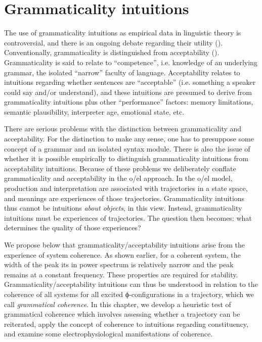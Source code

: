\chapter{Grammaticality intuitions}

The use of grammaticality intuitions as empirical data in linguistic theory is controversial, and there is an ongoing debate regarding their utility (\citealt{CulicoverJackendoff2010,FFerreira2005,GibsonFedorenko2010,GibsonFedorenko2013,SprouseAlmeida2013}). Conventionally, grammaticality is distinguished from acceptability (\citealt{Schütze2016,Sprouse2007}). Grammaticality is said to relate to “competence”, i.e. knowledge of an underlying grammar, the isolated “narrow” faculty of language. Acceptability relates to intuitions regarding whether sentences are “acceptable” (i.e. something a speaker could say and/or understand), and these intuitions are presumed to derive from grammaticality intuitions plus other “performance” factors: memory limitations, semantic plausibility, interpreter age, emotional state, etc. 

  There are serious problems with the distinction between grammaticality and acceptability. For the distinction to make any sense, one has to presuppose some concept of a grammar and an isolated syntax module. There is also the issue of whether it is possible empirically to distinguish grammaticality intuitions from acceptability intuitions. Because of these problems we deliberately conflate grammaticality and acceptability in the o/el approach. In the o/el model, production and interpretation are associated with trajectories in a state space, and meanings are experiences of those trajectories. Grammaticality intuitions thus cannot be intuitions \textit{about objects}, in this view. Instead, grammaticality intuitions must be experiences of trajectories. The question then becomes: what determines the quality of those experiences? 

  We propose below that grammaticality/acceptability intuitions arise from the experience of system coherence. As shown earlier, for a coherent system, the width of the peak its in power spectrum is relatively narrow and the peak remains at a constant frequency. These properties are required for stability. Grammaticality/acceptability intuitions can thus be understood in relation to the coherence of all systems for all excited ϕ-configurations in a trajectory, which we call \textit{grammatical coherence}. In this chapter, we develop a heuristic test of grammatical coherence which involves assessing whether a trajectory can be reiterated, apply the concept of coherence to intuitions regarding constituency, and examine some electrophysiological manifestations of coherence. 

